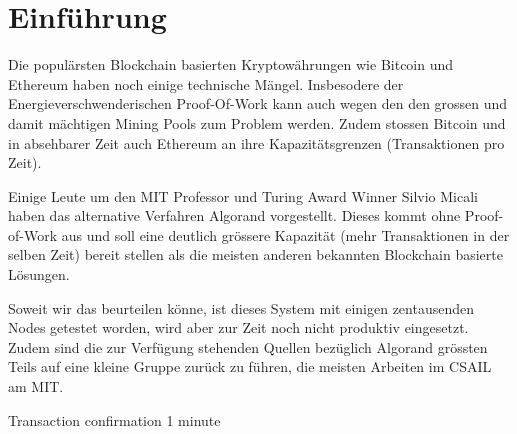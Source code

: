 \documentclass[11pt,a4paper]{article}
\begin{document}
\section{Einführung} \label{sec:introduction}
Die populärsten Blockchain basierten Kryptowährungen wie Bitcoin und Ethereum haben noch einige technische Mängel.
Insbesodere der Energieverschwenderischen Proof-Of-Work kann auch wegen den den grossen 
und damit mächtigen Mining Pools zum Problem werden.
Zudem stossen Bitcoin und in absehbarer Zeit auch Ethereum an ihre Kapazitätsgrenzen (Transaktionen pro Zeit).

Einige Leute um den MIT Professor und Turing Award Winner Silvio Micali haben das alternative Verfahren Algorand vorgestellt.
Dieses kommt ohne Proof-of-Work aus und soll eine deutlich grössere Kapazität (mehr Transaktionen in der selben Zeit) bereit stellen
als die meisten anderen bekannten Blockchain basierte Lösungen.

Soweit wir das beurteilen könne, ist dieses System mit einigen zentausenden Nodes getestet worden,
wird aber zur Zeit noch nicht produktiv eingesetzt.
Zudem sind die zur Verfügung stehenden Quellen bezüglich Algorand grössten Teils auf eine kleine Gruppe zurück zu führen,
die meisten Arbeiten im CSAIL am MIT. %

Transaction confirmation 1 minute \cite[1. Introduction]{Gilad:2017:ASB:3132747.3132757}



\cite{Gilad:2017:ASB:3132747.3132757}
\cite{Chen:2017}
\cite{ScalingConsensus}





\newpage


% 
{}
\end{document}

